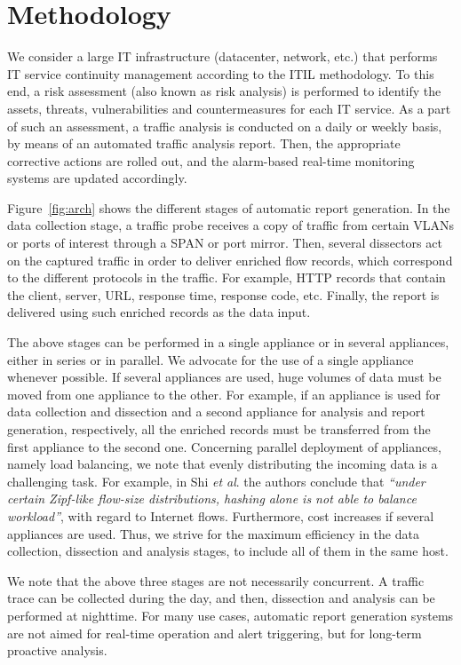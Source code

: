 \documentclass[AMA,STIX1COL]{WileyNJD-v2}
\begin{document}
\section{Methodology}
We consider a large IT infrastructure (datacenter, network, etc.) that performs IT service continuity management according to the ITIL methodology. To this end, a risk assessment (also known as risk analysis)   is performed to identify the assets, threats, vulnerabilities and countermeasures for each IT service. As a part of such an assessment, a traffic analysis is conducted on a daily or weekly basis, by means of an automated traffic analysis report. Then, the appropriate corrective actions are rolled out, and the alarm-based real-time monitoring systems are updated accordingly.

Figure~\ref{fig:arch} shows the different stages of automatic report generation. In the data collection stage, a traffic probe receives a copy of traffic from certain VLANs or ports of interest through a SPAN or port mirror. Then, several dissectors act on the captured traffic in order to deliver enriched flow records, which correspond to the different protocols in the traffic. For example, HTTP records that contain the client, server, URL, response time, response code, etc. Finally, the report is delivered using such enriched records as the data input.  %

The above stages can be performed in a single appliance or in several appliances, either in series or in parallel. We advocate for the use of a single appliance whenever possible. If several appliances are used, huge volumes of data must be moved from one appliance to the other. For example, if an appliance is used for data collection and dissection and a second appliance for analysis and report generation, respectively, all the enriched records must be transferred from the first appliance to the second one. Concerning parallel deployment of appliances, namely load balancing, we note that evenly distributing the incoming data is a challenging task. For example, in \cite{zipf} Shi \textit{et al}. the authors conclude that \textit{``under certain Zipf-like flow-size distributions, hashing alone is not able to balance workload''}, with regard to Internet flows.
Furthermore, cost increases if several appliances are used. Thus, we strive for the maximum efficiency in the data collection, dissection and analysis stages, to include all of them in the same host.

We note that the above three stages are not necessarily concurrent. A traffic trace can be collected during the day, and then, dissection and analysis can be performed at nighttime. For many use cases, automatic report generation systems are not aimed for real-time operation and alert triggering, but for long-term proactive analysis.
\end{document}
